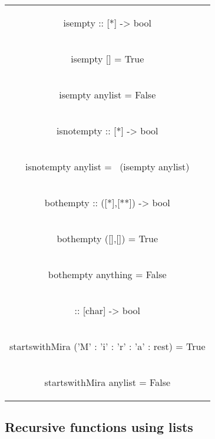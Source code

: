 \documentclass[11pt]{article}
\begin{document}
\begin{flushleft}
    

\begin{tabular}{ |c| } 
 \hline
\begin{flushleft} isempty :: [*] -> bool \end{flushleft}\\
\begin{flushleft}isempty [] = True\end{flushleft}\\
\begin{flushleft}isempty anylist = False\end{flushleft}\\
\begin{flushleft}isnotempty :: [*] -> bool\end{flushleft}\\
\begin{flushleft}isnotempty anylist = ~(isempty anylist)\end{flushleft}\\
\begin{flushleft}bothempty :: ([*],[**]) -> bool\end{flushleft}\\
\begin{flushleft}bothempty ([],[]) = True\end{flushleft}\\
\begin{flushleft}bothempty anything = False\end{flushleft}\\
\begin{flushleft} :: [char] -> bool\end{flushleft}\\
\begin{flushleft}startswithMira (’M’ : ’i’ : ’r’ : ’a’ : rest) = True\end{flushleft}\\
\begin{flushleft}startswithMira anylist = False\end{flushleft}\\
\hline
\end{tabular}
\label{Tab:1}

\end{flushleft}

\subsection{Recursive functions using lists}
\end{document}
